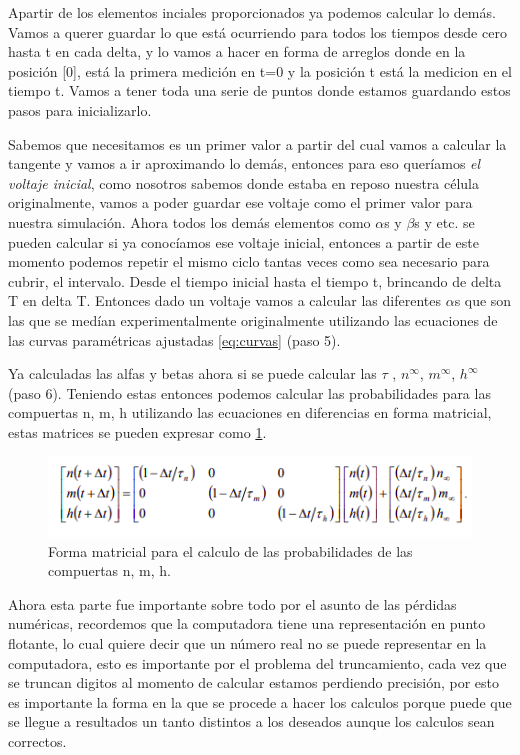 Apartir de los elementos inciales proporcionados ya podemos calcular lo demás. Vamos a querer guardar lo que está ocurriendo para todos los tiempos desde cero hasta t en cada delta, y lo vamos a hacer en forma de arreglos donde en la posición [0], está la primera medición en t=0 y la posición t está la medicion en el tiempo t. Vamos  a tener toda una serie de puntos donde estamos guardando estos pasos para inicializarlo. 

Sabemos que necesitamos es un primer valor a partir del cual vamos a calcular la tangente y vamos a ir aproximando lo demás, entonces para eso queríamos \emph{el voltaje inicial}, como nosotros sabemos donde estaba en reposo nuestra célula originalmente, vamos a poder guardar ese voltaje como el primer valor para nuestra simulación. Ahora todos los demás elementos como $\alpha$s y $\beta$s y etc. se pueden calcular si ya conocíamos ese voltaje inicial, entonces a partir de este momento podemos repetir el mismo ciclo tantas veces como sea necesario para cubrir, el intervalo. 
Desde el tiempo inicial hasta el tiempo t, brincando de delta T en delta T. 
Entonces dado un voltaje vamos a calcular las diferentes \(\alpha\)s que son las que se medían experimentalmente originalmente utilizando las ecuaciones  de las curvas paramétricas ajustadas \ref{eq:curvas} (paso 5).

Ya calculadas las alfas y betas ahora si se puede calcular las $\tau$ , $n^{\infty}$, $m^{\infty}$, $h^{\infty}$ (paso 6).
Teniendo estas entonces podemos calcular las probabilidades para las compuertas n, m, h utilizando las ecuaciones en diferencias en forma matricial, estas matrices se pueden expresar como \ref{fig:matriX}.

\begin{figure}[H]
 \centering
 \includegraphics[scale=0.7]{../Figuras/matrix.png}
 \caption{Forma matricial para el calculo de las probabilidades de las compuertas n, m, h.}
 \label{fig:matriX}
\end{figure}

Ahora esta parte fue importante sobre todo por el asunto de las pérdidas numéricas, recordemos que la computadora tiene una representación en punto flotante, lo cual quiere decir que un número real no se puede representar en la computadora, esto es importante por el problema del truncamiento, cada vez que se truncan digitos al momento de calcular estamos perdiendo precisión, por esto es importante la forma en la que se procede a hacer los calculos porque puede que se llegue a resultados un tanto distintos a los deseados aunque los calculos sean correctos. 

